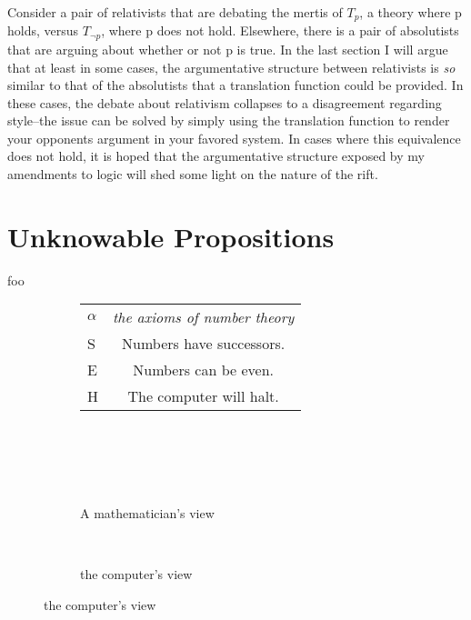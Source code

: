 \documentclass[12pt]{article}
\begin{document}
\begin{flushleft}
Consider a pair of relativists that are debating the mertis of $T_p$, a theory where p holds, versus $T_{\neg p}$, where p does not hold.
Elsewhere, there is a pair of absolutists that are arguing about whether or not p is true.
In the last section I will argue that at least in some cases, the argumentative structure between relativists is \textit{so} similar to that of the absolutists that a translation function could be provided.
In these cases, the debate about relativism collapses to a disagreement regarding style--the issue can be solved by simply using the translation function to render your opponents argument in your favored system.
In cases where this equivalence does not hold, it is hoped that the argumentative structure exposed by my amendments to logic will shed some light on the nature of the rift.

\section{Unknowable Propositions}
foo

\begin{figure}[h]
    \centering
    \begin{subfigure}{\linewidth}
        \centering
        \begin{tabular}{l|c}
            \hline
            $\alpha$ & \textit{the axioms of number theory}\\
            S & Numbers have successors.\\
            E & Numbers can be even.\\
            H & The computer will halt.\\
            \hline
        \end{tabular}
        \label{fig:sub1}
    \end{subfigure}\\
    \par\bigskip
    \begin{subfigure}{.5\linewidth}
        \centering
        \fitchctx
        {
            \pline{\bigstar}\\
            \subproof
            {
                \pline{\mathnormal{\alpha}}
            }
            {
                 \\
            }
        }
        \caption{A mathematician's view}
        \label{fig:sub2}
    \end{subfigure}%
    \begin{subfigure}{.5\linewidth}
        \centering
        \fitchctx
        {
            \subproof
            {
                 \\
            }
            {
                \pline{\bigstar}
            }
        }
        \caption{the computer's view}
        \label{fig:sub3}
    \end{subfigure}
    \label{fig:test}
\end{figure}



\end{flushleft}
\end{document}
